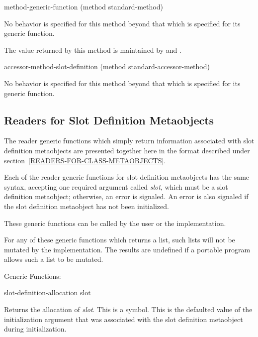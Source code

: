 \begin{defun}
method-generic-function (method standard-method)

No behavior is specified for this method beyond that which is specified for its
generic function.

The value returned by this method is maintained by  and .
\end{defun}

\begin{defun}
accessor-method-slot-definition (method standard-accessor-method)

No behavior is specified for this method beyond that which is specified for its
generic function.
\end{defun}

\subsection{Readers for Slot Definition Metaobjects}
\label{READERS-FOR-SLOT-DEFINITION-METAOBJECTS}

The reader generic functions which simply return information associated with
slot definition metaobjects are presented together here in the format described
under section~\ref{READERS-FOR-CLASS-METAOBJECTS}.

Each of the reader generic functions for slot definition metaobjects has the
same syntax, accepting one required argument called \emph{slot}, which must be a slot
definition metaobject; otherwise, an error is signaled. An error is also
signaled if the slot definition metaobject has not been initialized.

These generic functions can be called by the user or the implementation.

For any of these generic functions which returns a list, such lists will not be
mutated by the implementation. The results are undefined if a portable program
allows such a list to be mutated.

Generic Functions:

\begin{defun}
slot-definition-allocation slot

Returns the allocation of \emph{slot}. This is a symbol. This is the defaulted
value of the  initialization argument that was associated with
the slot definition metaobject during initialization.
\end{defun}

